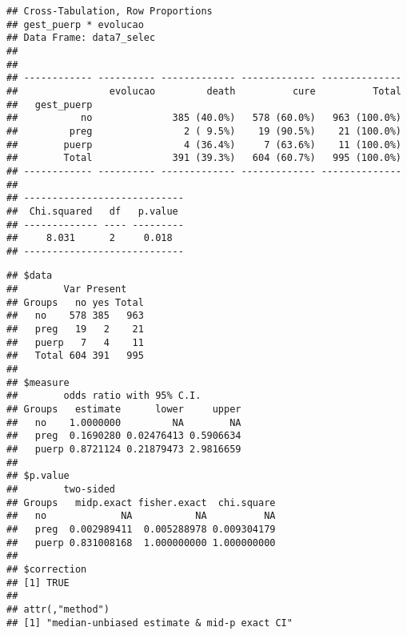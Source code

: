 \documentclass[
]{article}
\newenvironment{Shaded}{\begin{snugshade}}{\end{snugshade}}
\newcommand{\DataTypeTok}[1]{\textcolor[rgb]{0.13,0.29,0.53}{#1}}
\newcommand{\KeywordTok}[1]{\textcolor[rgb]{0.13,0.29,0.53}{\textbf{#1}}}
\newcommand{\NormalTok}[1]{#1}
\newcommand{\OperatorTok}[1]{\textcolor[rgb]{0.81,0.36,0.00}{\textbf{#1}}}
\newcommand{\OtherTok}[1]{\textcolor[rgb]{0.56,0.35,0.01}{#1}}
\newcommand{\StringTok}[1]{\textcolor[rgb]{0.31,0.60,0.02}{#1}}
\begin{document}
\begin{Shaded}
\end{Shaded}

\begin{Shaded}
\end{Shaded}

\begin{verbatim}
## Cross-Tabulation, Row Proportions  
## gest_puerp * evolucao  
## Data Frame: data7_selec  
## 
## 
## ------------ ---------- ------------- ------------- --------------
##                evolucao         death          cure          Total
##   gest_puerp                                                      
##           no              385 (40.0%)   578 (60.0%)   963 (100.0%)
##         preg                2 ( 9.5%)    19 (90.5%)    21 (100.0%)
##        puerp                4 (36.4%)     7 (63.6%)    11 (100.0%)
##        Total              391 (39.3%)   604 (60.7%)   995 (100.0%)
## ------------ ---------- ------------- ------------- --------------
## 
## ----------------------------
##  Chi.squared   df   p.value 
## ------------- ---- ---------
##     8.031      2     0.018  
## ----------------------------
\end{verbatim}

\begin{Shaded}
\end{Shaded}

\begin{verbatim}
## $data
##        Var Present
## Groups   no yes Total
##   no    578 385   963
##   preg   19   2    21
##   puerp   7   4    11
##   Total 604 391   995
## 
## $measure
##        odds ratio with 95% C.I.
## Groups   estimate      lower     upper
##   no    1.0000000         NA        NA
##   preg  0.1690280 0.02476413 0.5906634
##   puerp 0.8721124 0.21879473 2.9816659
## 
## $p.value
##        two-sided
## Groups   midp.exact fisher.exact  chi.square
##   no             NA           NA          NA
##   preg  0.002989411  0.005288978 0.009304179
##   puerp 0.831008168  1.000000000 1.000000000
## 
## $correction
## [1] TRUE
## 
## attr(,"method")
## [1] "median-unbiased estimate & mid-p exact CI"
\end{verbatim}
\end{document}
